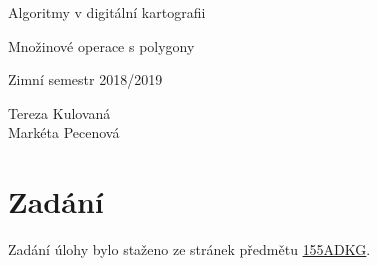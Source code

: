 \documentclass[a4paper, 12pt]{article}
\begin{document}
\begin{titlepage}
\begin{center}
\Huge
\vspace*{4.5cm}
Algoritmy v digitální kartografii\\
\vspace{0.2cm}

\Large  
Množinové operace s polygony\\
\vspace{0.2cm}

\normalsize  
Zimní semestr 2018/2019\\
\vspace{14cm}
\end{center}

\begin{flushright}
\Large
Tereza Kulovaná \\
Markéta Pecenová \\
\end{flushright}

\end{titlepage}


\pagestyle{plain}     %
\setcounter{page}{1}  %

\tableofcontents
\newpage

\section{Zadání}
Zadání úlohy bylo staženo ze stránek předmětu \href{https://web.natur.cuni.cz/~bayertom/index.php/teaching/algoritmy-v-digitalni-kartografii}{155ADKG}.
\end{document}
